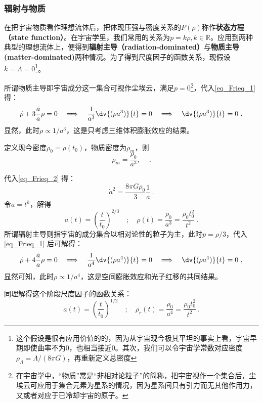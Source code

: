 \subsubsection{辐射与物质}
在把宇宙物质看作理想流体后，把体现压强与密度关系的$P(\rho)$称作\textbf{状态方程（state function）}。在宇宙学里，我们常用的关系为$p=k\rho,k\in \mathbb R$。应用到两种典型的理想流体上，便得到\textbf{辐射主导（radiation-dominated）}与\textbf{物质主导(matter-dominated)}两种情况。为了得到尺度因子的函数关系，现假设$k=\Lambda=0$\footnote{这个假设是很有应用价值的的，因为从宇宙现今极其平坦的事实上看，宇宙早期即使曲率不为0，也相当接近0。其次，我们可以令宇宙学常数对应密度$\rho_{\Lambda}=\Lambda/(8\pi G)$，再重新定义总密度}。

所谓物质主导即宇宙成分这一集合可视作尘埃云，满足$p=0$\footnote{在宇宙学中，“物质”常是“非相对论粒子”的简称，把宇宙视作一个集合后，尘埃云可应用于集合元素为星系的情况，因为星系间只有引力而无其他作用力，又或者对应于已冷却宇宙的原子。}，代入\autoref{eq_Frieq_1} 得：
\begin{equation}\dot{\rho}+3\frac{\dot{a}}{a}\rho=0\quad\Longrightarrow\quad\frac1{a^3}\dv{(\rho a^3)}{t}=0\quad\Longrightarrow\quad\dv{(\rho a^3)}{t}=0 ~,\end{equation}
显然，此时$\rho\propto 1/a^3$，这是只考虑三维体积膨胀效应的结果。

定义现今密度$\rho_0=\rho(t_0)$，物质密度为$\rho_m$，则
\begin{equation}
\rho_m=\frac{\rho_0}{a^3},\quad ~.
\end{equation}

代入\autoref{eq_Frieq_2} 得：
\begin{equation}
\dot{a}^2=\frac{8\pi G\rho_0}3\frac1a ~.
\end{equation}
令$a=t^k$，解得
\begin{equation}a(t)=\left(\frac{t}{t_0}\right)^{2/3}\quad;\quad\rho(t)=\frac{\rho_0}{a^3}=\frac{\rho_0t_0^2}{t^2}~.\end{equation}
所谓辐射主导则指宇宙的成分集合以相对论性的粒子为主，此时$p=\rho/3$，代入\autoref{eq_Frieq_1} 后可解得：
\begin{equation}\dot{\rho}+4\frac{\dot{a}}{a}\rho=0\quad\Longrightarrow\quad\frac1{a^4}\dv{(\rho a^4)}{t}=0\quad\Longrightarrow\quad\dv{(\rho a^4)}{t} =0~,\end{equation}
显然可知，此时$\rho\propto  1/a^4$，这是空间膨胀效应和光子红移的共同结果。

同理解得这个阶段尺度因子的函数关系：
\begin{equation}
a(t)=\left(\frac{t}{t_0}\right)^{1/2}\quad;\quad\rho_r(t)=\frac{\rho_0}{a^4}=\frac{\rho_0t_0^2}{t^2} ~.
\end{equation}

